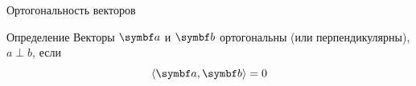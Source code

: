 




\begin{frame}{Ортогональность векторов}

\begin{block}{Определение}
Векторы $\ba$ и $\bb$ \alert{ортогональны} (или \alert{перпендикулярны}), $a\perp b$, если
\[
  \langle \ba, \bb \rangle =0
\]
\end{block}

\end{frame}


